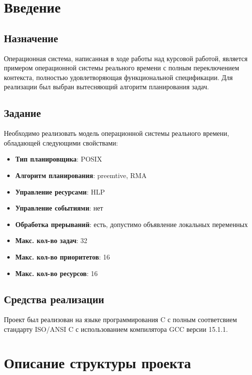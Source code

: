 \documentclass[14pt, draft, oneside]{extreport}
\begin{document}
\tableofcontents

\chapter{Введение}
\section{Назначение}

Операционная система, написанная в ходе работы над курсовой работой,
является примером операционной системы реального времени с полным 
переключением контекста, полностью удовлетворяющая 
функциональной спецификации.
Для реализации был выбран вытесняющий алгоритм планирования задач.

\section{Задание}

Необходимо реализовать модель операционной системы реального 
времени, обладающей следующими свойствами:

\begin{itemize}
    \item \textbf{Тип планировщика}: POSIX
    \item \textbf{Алгоритм планирования}: preemtive, RMA
    \item \textbf{Управление ресурсами}: HLP
    \item \textbf{Управление событиями}: нет
    \item \textbf{Обработка прерываний}: есть, допустимо объявление
        локальных переменных
    \item \textbf{Макс. кол-во задач}: 32
    \item \textbf{Макс. кол-во приоритетов}: 16
    \item \textbf{Макс. кол-во ресурсов}: 16
\end{itemize}

\section {Средства реализации}

Проект был реализован на языке программирования C с полным
соответсвием стандарту ISO/ANSI C с использованием компилятора 
GCC версии 15.1.1.

\chapter{Описание структуры проекта}
\end{document}
